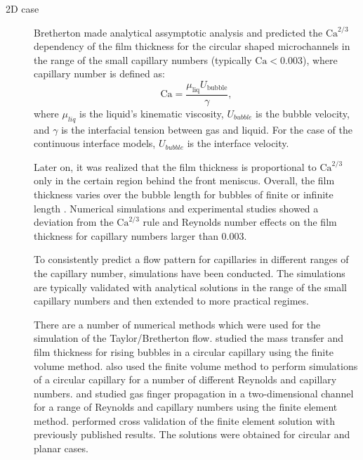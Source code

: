 \documentclass{CFD2011}
\newcommand{\Ca}{\mathrm{Ca}}
\begin{document}
\begin{description}
\item[2D case]
Bretherton made analytical assymptotic analysis and predicted the $\Ca^{2/3}$ dependency of the film
thickness for the circular shaped microchannels in the range of the small capillary numbers
(typically $\Ca<0.003$), where capillary number is defined as:
\begin{equation}
\label{capillary:number:definition}
\Ca=\frac{\mu_{\mathrm{liq}} U_\mathrm{bubble}}{\gamma},
\end{equation}
where $\mu_{liq}$ is the liquid's kinematic viscosity, $U_{bubble}$ is the bubble velocity, and
$\gamma$ is the interfacial tension between gas and liquid. For the case of the continuous
interface models,  $U_{bubble}$ is the interface velocity.

Later on, it was realized
\cite{wong-films,wong-pressure} that the film thickness
is proportional to $\Ca^{2/3}$ only in the certain region behind the front meniscus. Overall, the
film thickness
varies over the bubble length for bubbles of finite or infinite length
\cite{heil-threedim}. Numerical
simulations \cite{giavedoni-numerical} and experimental studies
\cite{kreutzer-pressure-drop} showed a deviation from the $\Ca^{2/3}$ rule and Reynolds number 
effects on the film thickness for capillary numbers larger than $0.003$.

To consistently  predict a flow pattern for capillaries in
different ranges of the capillary number, simulations have been conducted. The simulations are
typically validated with analytical solutions in the range of the small capillary numbers
 and then extended to more practical regimes.

There are a number of numerical methods which
were used for the simulation of the Taylor/Bretherton flow.
\citet{vanbaten-circular} studied the mass transfer and film
thickness for rising bubbles in a circular capillary using the finite volume method.
\citet{kreutzer-pressure-drop} also used the finite volume method to perform
simulations of a circular capillary for a number of different
Reynolds and capillary numbers. 
\citet{heil-bretherton} and \citet{ingham-plates} studied gas finger propagation in
a two-dimensional channel for a range of Reynolds and capillary
numbers using the finite element method. \citet{giavedoni-numerical} performed cross validation of
the
finite element solution with previously published results.
The solutions were obtained for circular and planar cases. 


\end{description}
\end{document}
